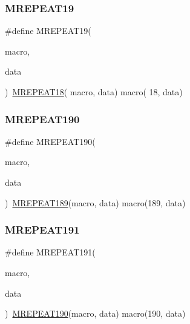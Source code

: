 \mbox{\label{group__group__sam0__utils__mrepeat_ga9062731e6246bd538334f265e34870df}} 
\subsubsection{\texorpdfstring{MREPEAT19}{MREPEAT19}}
{\footnotesize\ttfamily \#define M\+R\+E\+P\+E\+A\+T19(\begin{DoxyParamCaption}\item[{}]{macro,  }\item[{}]{data }\end{DoxyParamCaption})~\mbox{\hyperlink{group__group__sam0__utils__mrepeat_gaeac781e6017f799e59bfc8d46e5cc9a1}{M\+R\+E\+P\+E\+A\+T18}}( macro, data)   macro( 18, data)}

\mbox{\label{group__group__sam0__utils__mrepeat_ga90b2ca3e144e35ea7d3f1f757868cbab}} 
\subsubsection{\texorpdfstring{MREPEAT190}{MREPEAT190}}
{\footnotesize\ttfamily \#define M\+R\+E\+P\+E\+A\+T190(\begin{DoxyParamCaption}\item[{}]{macro,  }\item[{}]{data }\end{DoxyParamCaption})~\mbox{\hyperlink{group__group__sam0__utils__mrepeat_ga691dc645795e6f5cb2083e198a7af972}{M\+R\+E\+P\+E\+A\+T189}}(macro, data)   macro(189, data)}

\mbox{\label{group__group__sam0__utils__mrepeat_ga8914eac2b15fba3933b8bd800427a153}} 
\subsubsection{\texorpdfstring{MREPEAT191}{MREPEAT191}}
{\footnotesize\ttfamily \#define M\+R\+E\+P\+E\+A\+T191(\begin{DoxyParamCaption}\item[{}]{macro,  }\item[{}]{data }\end{DoxyParamCaption})~\mbox{\hyperlink{group__group__sam0__utils__mrepeat_ga90b2ca3e144e35ea7d3f1f757868cbab}{M\+R\+E\+P\+E\+A\+T190}}(macro, data)   macro(190, data)}

